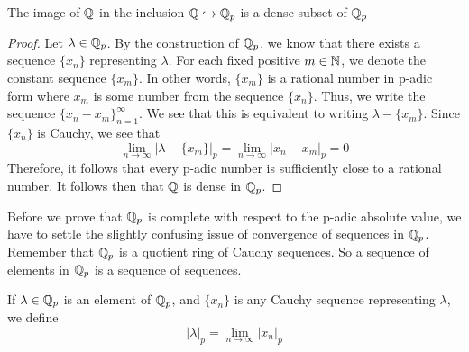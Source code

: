 \documentclass[a4paper]{article}
\begin{document}
\begin{proposition}
The image of $\mathbb Q$ in the inclusion $\mathbb Q\hookrightarrow\mathbb Q_p$ is a
dense subset of $\mathbb Q_p$
\end{proposition}
\begin{proof}
Let $\lambda\in\mathbb Q_p$.  By the construction of $\mathbb Q_p$, we know that
there exists a sequence $\{x_n\}$ representing $\lambda$.  For each 
fixed positive $m\in\mathbb N$, we denote the constant sequence $\{x_m\}$. 
In other words, $\{x_m\}$ is a rational number in p-adic form where
$x_m$ is some number from the sequence $\{x_n\}$.  Thus, we
write the sequence $\{x_n-x_m\}_{n=1}^\infty$.  We see that this is
equivalent to writing $\lambda-\{x_m\}$.  Since $\{x_n\}$ is Cauchy, we
see that
\[
	\lim_{n\to\infty}|\lambda-\{x_m\}|_p=
    \lim_{n\to\infty}|x_n-x_m|_p=0
\]
Therefore, it follows that every p-adic number is sufficiently close
to a rational number.  It follows then that $\mathbb Q$ is dense in 
$\mathbb Q_p$.
\end{proof}

Before we prove that $\mathbb Q_p$ is complete with respect to the p-adic
absolute value, we have to settle the slightly confusing issue of
convergence of sequences in $\mathbb Q_p$.  Remember that $\mathbb Q_p$ is a
quotient ring of Cauchy sequences.  So a sequence of elements in $\mathbb
Q_p$ is a sequence of sequences.

\begin{definition}
If $\lambda\in\mathbb Q_p$ is an element of $\mathbb Q_p$, and $\{x_n\}$ is 
any Cauchy sequence representing $\lambda$, we define
\[
	|\lambda|_p=\lim_{n\to\infty}|x_n|_p
\]
\end{definition}
\end{document}

